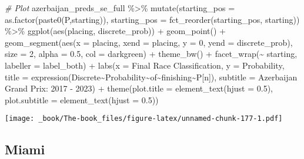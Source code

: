 \documentclass[
]{book}
\newenvironment{Shaded}{\begin{snugshade}}{\end{snugshade}}
\newcommand{\AttributeTok}[1]{\textcolor[rgb]{0.77,0.63,0.00}{#1}}
\newcommand{\CommentTok}[1]{\textcolor[rgb]{0.56,0.35,0.01}{\textit{#1}}}
\newcommand{\DecValTok}[1]{\textcolor[rgb]{0.00,0.00,0.81}{#1}}
\newcommand{\FloatTok}[1]{\textcolor[rgb]{0.00,0.00,0.81}{#1}}
\newcommand{\FunctionTok}[1]{\textcolor[rgb]{0.00,0.00,0.00}{#1}}
\newcommand{\NormalTok}[1]{#1}
\newcommand{\SpecialCharTok}[1]{\textcolor[rgb]{0.00,0.00,0.00}{#1}}
\newcommand{\StringTok}[1]{\textcolor[rgb]{0.31,0.60,0.02}{#1}}
\begin{document}
\begin{Shaded}
\begin{Highlighting}[]
\CommentTok{\# Plot}
\NormalTok{azerbaijan\_preds\_se\_full }\SpecialCharTok{\%\textgreater{}\%}
  \FunctionTok{mutate}\NormalTok{(}\AttributeTok{starting\_pos =} \FunctionTok{as.factor}\NormalTok{(}\FunctionTok{paste0}\NormalTok{(}\StringTok{\textquotesingle{}P\textquotesingle{}}\NormalTok{,starting)),}
         \AttributeTok{starting\_pos =} \FunctionTok{fct\_reorder}\NormalTok{(starting\_pos, starting)) }\SpecialCharTok{\%\textgreater{}\%}
  \FunctionTok{ggplot}\NormalTok{(}\FunctionTok{aes}\NormalTok{(placing, discrete\_prob)) }\SpecialCharTok{+}
  \FunctionTok{geom\_point}\NormalTok{() }\SpecialCharTok{+}
  \FunctionTok{geom\_segment}\NormalTok{(}\FunctionTok{aes}\NormalTok{(}\AttributeTok{x =}\NormalTok{ placing, }\AttributeTok{xend =}\NormalTok{ placing, }\AttributeTok{y =} \DecValTok{0}\NormalTok{, }\AttributeTok{yend =}\NormalTok{ discrete\_prob),}
               \AttributeTok{size =} \DecValTok{2}\NormalTok{, }\AttributeTok{alpha =} \FloatTok{0.5}\NormalTok{, }\AttributeTok{col =} \StringTok{\textquotesingle{}darkgreen\textquotesingle{}}\NormalTok{) }\SpecialCharTok{+}
  \FunctionTok{theme\_bw}\NormalTok{() }\SpecialCharTok{+}
  \FunctionTok{facet\_wrap}\NormalTok{(}\SpecialCharTok{\textasciitilde{}}\NormalTok{ starting, }\AttributeTok{labeller =}\NormalTok{ label\_both) }\SpecialCharTok{+}
  \FunctionTok{labs}\NormalTok{(}\AttributeTok{x =} \StringTok{\textquotesingle{}Final Race Classification\textquotesingle{}}\NormalTok{,}
       \AttributeTok{y =} \StringTok{\textquotesingle{}Probability\textquotesingle{}}\NormalTok{,}
       \AttributeTok{title =} \FunctionTok{expression}\NormalTok{(Discrete}\SpecialCharTok{\textasciitilde{}}\NormalTok{Probability}\SpecialCharTok{\textasciitilde{}}\NormalTok{of}\SpecialCharTok{\textasciitilde{}}\NormalTok{finishing}\SpecialCharTok{\textasciitilde{}}\NormalTok{P[n]),}
       \AttributeTok{subtitle =} \StringTok{\textquotesingle{}Azerbaijan Grand Prix: 2017 {-} 2023\textquotesingle{}}\NormalTok{) }\SpecialCharTok{+}
  \FunctionTok{theme}\NormalTok{(}\AttributeTok{plot.title =} \FunctionTok{element\_text}\NormalTok{(}\AttributeTok{hjust =} \FloatTok{0.5}\NormalTok{),}
        \AttributeTok{plot.subtitle =} \FunctionTok{element\_text}\NormalTok{(}\AttributeTok{hjust =} \FloatTok{0.5}\NormalTok{)) }
\end{Highlighting}
\end{Shaded}

\texttt{[image: \_book/The-book\_files/figure-latex/unnamed-chunk-177-1.pdf]}

\hypertarget{miami}{%
\subsection{Miami}\label{miami}}
\end{document}
